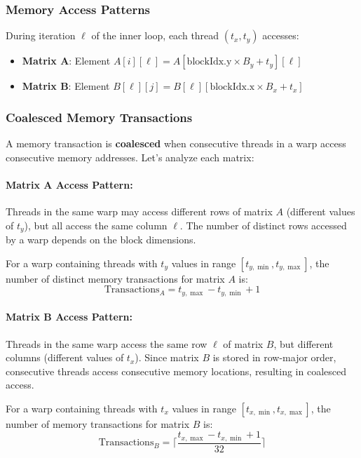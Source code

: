 \documentclass{amsbook}
\theoremstyle{definition}
\begin{document}
\subsubsection{Memory Access Patterns}

During iteration $\ell$ of the inner loop, each thread $(t_x, t_y)$ accesses:
\begin{itemize}
\item \textbf{Matrix A}: Element $A[i][\ell] = A[\text{blockIdx.y} \times B_y + t_y][\ell]$
\item \textbf{Matrix B}: Element $B[\ell][j] = B[\ell][\text{blockIdx.x} \times B_x + t_x]$
\end{itemize}

\subsubsection{Coalesced Memory Transactions}

A memory transaction is \textbf{coalesced} when consecutive threads in a warp access consecutive memory addresses. Let's analyze each matrix:

\paragraph{Matrix A Access Pattern:}
Threads in the same warp may access different rows of matrix $A$ (different values of $t_y$), but all access the same column $\ell$. The number of distinct rows accessed by a warp depends on the block dimensions.

For a warp containing threads with $t_y$ values in range $[t_{y,\min}, t_{y,\max}]$, the number of distinct memory transactions for matrix $A$ is:
\begin{equation}
\text{Transactions}_A = t_{y,\max} - t_{y,\min} + 1
\end{equation}

\paragraph{Matrix B Access Pattern:}
Threads in the same warp access the same row $\ell$ of matrix $B$, but different columns (different values of $t_x$). Since matrix $B$ is stored in row-major order, consecutive threads access consecutive memory locations, resulting in coalesced access.

For a warp containing threads with $t_x$ values in range $[t_{x,\min}, t_{x,\max}]$, the number of memory transactions for matrix $B$ is:
\begin{equation}
\text{Transactions}_B = \lceil \frac{t_{x,\max} - t_{x,\min} + 1}{32} \rceil
\end{equation}
\end{document}
